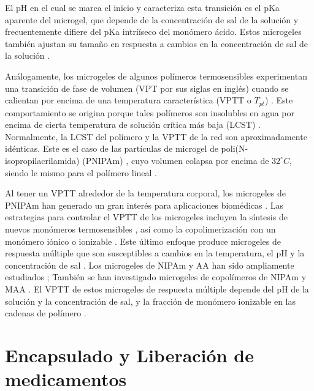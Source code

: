El pH en el cual se marca el inicio y caracteriza esta transici\'on es el pKa aparente del microgel, que depende de la concentraci\'on de sal de la soluci\'on y frecuentemente difiere del pKa intrí\'iseco del mon\'omero \'acido.
Estos microgeles tambi\'en ajustan su tama\~no en respuesta a cambios en la concentraci\'on de sal de la soluci\'on \cite{snowden1996colloidal}.
	
An\'alogamente, los microgeles de algunos pol\'imeros termosensibles experimentan una transici\'on de fase de volumen (VPT por sus siglas en ingl\'es) cuando se calientan por encima de una temperatura caracter\'istica (VPTT o $T_{pt}$) \cite{Pelton1986,Pelton2000}.
Este comportamiento se origina porque tales pol\'imeros son insolubles en agua por encima de cierta temperatura de soluci\'on cr\'itica m\'as baja (LCST) \cite{Kawaguchi2020}.
Normalmente, la LCST del pol\'imero y la VPTT de la red  son aproximadamente id\'enticas. 
Este es el caso de las part\'iculas de microgel de poli(N-isopropilacrilamida) (PNIPAm) \cite{Pelton1986}, cuyo volumen colapsa por encima de $32   ^\circ C$, siendo le mismo para el  pol\'imero lineal \cite{Schild1992}.
	
Al tener un VPTT alrededor de la temperatura corporal, los microgeles de PNIPAm han generado un gran inter\'es para aplicaciones biom\'edicas \cite{Guan2011}.
Las estrategias para controlar el VPTT de los microgeles incluyen la s\'intesis de nuevos mon\'omeros termosensibles  \cite{Cai2007,Macchione2019}, as\'i como la copolimerizaci\'on con un mon\'omero i\'onico o ionizable  \cite{Hirose1987,Lopez2020}.
Este \'ultimo enfoque produce microgeles de respuesta m\'ultiple que son susceptibles a cambios en la temperatura, el pH y la concentraci\'on de sal  \cite{snowden1996colloidal, Farooqi2017}.
Los microgeles de NIPAm y AA han sido ampliamente estudiados \cite{Morris1997, Jones2000,Bradley2005,Begum2016};
Tambi\'en se han investigado microgeles de copol\'imeros de NIPAm y MAA  \cite{Dowding2000,Hoare2004,Giussi2015}.
El VPTT de estos microgeles de respuesta m\'ultiple depende del pH de la soluci\'on y la concentraci\'on de sal, y la fracci\'on de mon\'omero ionizable en las cadenas de pol\'imero  \cite{Morris1997,Jones2000, Hoare2004, Bradley2005, Lee2008,Wong2009,Hamzavi2016}.



\section{Encapsulado y Liberaci\'on de medicamentos}

